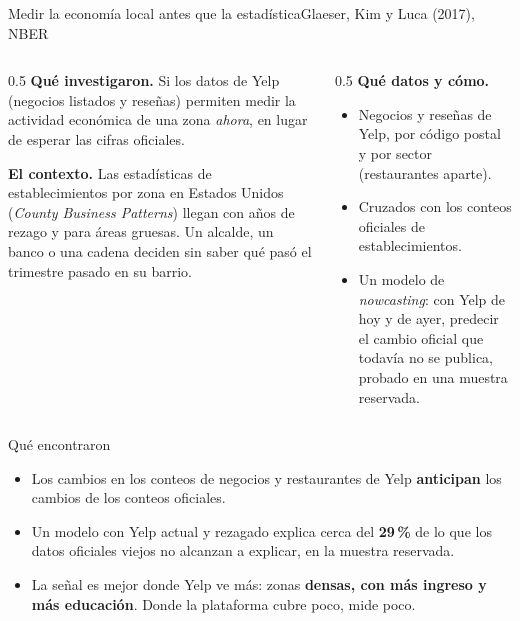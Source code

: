 \documentclass{beamer}
\begin{document}
\begin{frame}{Medir la economía local antes que la estadística}{Glaeser, Kim y Luca (2017), NBER}
\begin{columns}[T]
\begin{column}{0.5\textwidth}
\textbf{Qué investigaron.} Si los datos de Yelp (negocios listados y reseñas) permiten medir la actividad económica de una zona \emph{ahora}, en lugar de esperar las cifras oficiales.

\medskip
\textbf{El contexto.} Las estadísticas de establecimientos por zona en Estados Unidos (\emph{County Business Patterns}) llegan con años de rezago y para áreas gruesas. Un alcalde, un banco o una cadena deciden sin saber qué pasó el trimestre pasado en su barrio.
\end{column}
\begin{column}{0.5\textwidth}
\textbf{Qué datos y cómo.}
\begin{itemize}
  \item Negocios y reseñas de Yelp, por código postal y por sector (restaurantes aparte).
  \item Cruzados con los conteos oficiales de establecimientos.
  \item Un modelo de \emph{nowcasting}: con Yelp de hoy y de ayer, predecir el cambio oficial que todavía no se publica, probado en una muestra reservada.
\end{itemize}
\end{column}
\end{columns}
\end{frame}

\begin{frame}{Qué encontraron}
\begin{itemize}\itemsep6pt
  \item Los cambios en los conteos de negocios y restaurantes de Yelp \textbf{anticipan} los cambios de los conteos oficiales.
  \item Un modelo con Yelp actual y rezagado explica cerca del \textbf{29\,\%} de lo que los datos oficiales viejos no alcanzan a explicar, en la muestra reservada.
  \item La señal es mejor donde Yelp ve más: zonas \textbf{densas, con más ingreso y más educación}. Donde la plataforma cubre poco, mide poco.
\end{itemize}
\medskip
{}
\end{frame}
\end{document}

